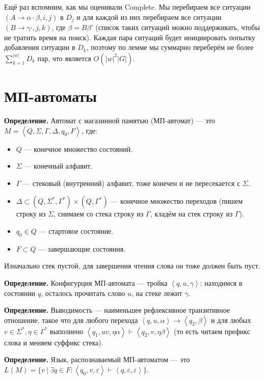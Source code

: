 \QED

Ещё раз вспомним, как мы оценивали Complete.
Мы перебираем все ситуации $(A \to \alpha \cdot \beta, i, j)$ в $D_j$ и для каждой из них перебираем все ситуации $(B \to \gamma \cdot, j, k)$, где $\beta = B \beta'$ (список таких ситуаций можно поддерживать, чтобы не тратить время на поиск).
Каждая пара ситуаций будет инициировать попытку добавления ситуации в $D_k$, поэтому по лемме мы суммарно переберём не более $\sum_{k=1}^{|w|} D_k$ пар, что является $O(|w|^2 |G|)$.

\section{МП-автоматы}
\textbf{Определение.} Автомат с магазинной памятью (МП-автомат) --- это $M = \left< Q, \Sigma, \Gamma, \Delta, q_0, F \right>$, где:
\begin{itemize}
    \item $Q$ --- конечное множество состояний.
    \item $\Sigma$ --- конечный алфавит.
    \item $\Gamma$ --- стековый (внутренний) алфавит, тоже конечен и не пересекается с $\Sigma$.
    \item $\Delta \subset (Q, \Sigma^*, \Gamma^*) \times (Q, \Gamma^*)$ --- конечное множество переходов (пишем строку из $\Sigma$, снимаем со стека строку из $\Gamma$, кладём на стек строку из $\Gamma$).
    \item $q_0 \in Q$ --- стартовое состояние.
    \item $F \subset Q$ --- завершающие состояния.
\end{itemize}
Изначально стек пустой, для завершения чтения слова он тоже должен быть пуст.

\textbf{Определение.} Конфигурция МП-автомата --- тройка $\left<q, u, \gamma \right>$: находимся в состоянии $q$, осталось прочитать слово $u$, на стеке лежит $\gamma$.

\textbf{Определение.} Выводимость --- наименьшее рефлексивное транзитивное отношение, такое что для любого перехода $\left<q, u, \alpha \right> \to \left<q_2, \beta \right>$ и для любых $v \in \Sigma^*, \eta \in \Gamma^*$ выполнено $\left< q_1, uv, \eta \alpha \right> \vdash \left< q_2, v, \eta \beta \right>$ (то есть читаем префикс слова и меняем суффикс стека).

\textbf{Определение.} Язык, распознаваемый МП-автоматом --- это $L(M) = \{v~|~ \exists q \in F: \left< q_0, v, \varepsilon \right> \vdash \left< q, \varepsilon, \varepsilon \right>\}$.

